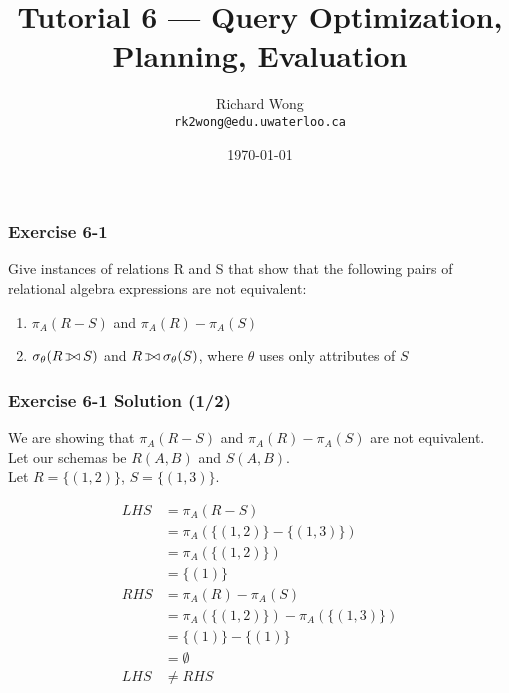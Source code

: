 

\def\ojoin{\setbox0=\hbox{$\bowtie$}%
  \rule[-.02ex]{.25em}{.4pt}\llap{\rule[\ht0]{.25em}{.4pt}}}
\def\leftouterjoin{\mathbin{\ojoin\mkern-5.8mu\bowtie}}

\title{Tutorial 6 --- Query Optimization, Planning, Evaluation }

\author{Richard Wong \\ \small \texttt{rk2wong@edu.uwaterloo.ca}}
\date{\today}




\begin{frame}
  \titlepage

\end{frame}


\begin{frame}
\frametitle{Exercise 6-1}

Give instances of relations R and S that show that the following pairs of relational algebra expressions are not equivalent:

\begin{enumerate}
  \item $\pi_A(R - S)$ and $\pi_A(R) - \pi_A(S)$
  \item $\sigma_{\theta}(R \leftouterjoin S)$ and $R \leftouterjoin \sigma_{\theta}(S)$, where $\theta$ uses only attributes of $S$
\end{enumerate}

\end{frame}


\begin{frame}
\frametitle{Exercise 6-1 Solution (1/2)}

We are showing that $\pi_A(R - S)$ and $\pi_A(R) - \pi_A(S)$ are not equivalent. \\
Let our schemas be $R(A,B)$ and $S(A,B)$. \\
Let $R = \{(1, 2)\}$, $S = \{(1, 3)\}$.

\begin{align*}
  LHS &= \pi_A (R-S) \\
  &= \pi_A (\{(1, 2)\} - \{(1, 3)\}) \\
  &= \pi_A (\{(1, 2)\}) \\
  &= \{(1)\} \\
  RHS &= \pi_A (R) - \pi_A (S) \\
  &= \pi_A (\{(1, 2)\}) - \pi_A (\{(1, 3)\}) \\
  &= \{(1)\} - \{(1)\} \\
  &= \emptyset \\
  LHS & \neq RHS
\end{align*}
\end{frame}


